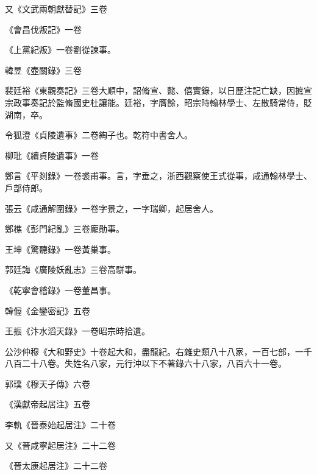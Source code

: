 \begin{pinyinscope}
 又《文武兩朝獻替記》三卷



 《會昌伐叛記》一卷



 《上黨紀叛》一卷劉從諫事。



 韓昱《壺關錄》三卷



 裴廷裕《東觀奏記》三卷大順中，詔脩宣、懿、僖實錄，以日歷注記亡缺，因摭宣宗政事奏記於監脩國史杜讓能。廷裕，字膺餘，昭宗時翰林學士、左散騎常侍，貶湖南，卒。



 令狐澄《貞陵遺事》二卷綯子也。乾符中書舍人。



 柳玭《續貞陵遺事》一卷



 鄭言《平剡錄》一卷裘甫事。言，字垂之，浙西觀察使王式從事，咸通翰林學士、戶部侍郎。



 張云《咸通解圍錄》一卷字景之，一字瑞卿，起居舍人。



 鄭樵《彭門紀亂》三卷龐勛事。



 王坤《驚聽錄》一卷黃巢事。



 郭廷誨《廣陵妖亂志》三卷高駢事。



 《乾寧會稽錄》一卷董昌事。



 韓偓《金鑾密記》五卷



 王振《汴水滔天錄》一卷昭宗時拾遺。



 公沙仲穆《大和野史》十卷起大和，盡龍紀。右雜史類八十八家，一百七部，一千八百二十八卷。失姓名八家，元行沖以下不著錄六十八家，八百六十一卷。



 郭璞《穆天子傳》六卷



 《漢獻帝起居注》五卷



 李軌《晉泰始起居注》二十卷



 又《晉咸寧起居注》二十二卷



 《晉太康起居注》二十二卷




\end{pinyinscope}
